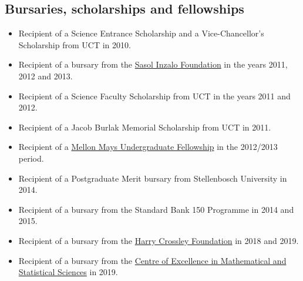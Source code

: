 \documentclass{article}
\begin{document}
\newpage
\subsection{Bursaries, scholarships and fellowships}
\begin{itemize}
	\item Recipient of a Science Entrance Scholarship and a Vice-Chancellor's Scholarship from UCT in 2010.
	\item Recipient of a bursary from the \href{http://www.sasolinzalofoundation.org.za/}{Sasol Inzalo Foundation} in the years 2011, 2012 and 2013.
	\item Recipient of a Science Faculty Scholarship from UCT in the years 2011 and 2012.
	\item Recipient of a Jacob Burlak Memorial Scholarship from UCT in 2011.
	\item Recipient of a \href{http://www.mmuf.org/}{Mellon Mays Undergraduate Fellowship} in the 2012/2013 period.
	\item Recipient of a Postgraduate Merit bursary from Stellenbosch University in 2014.
	\item Recipient of a bursary from the Standard Bank 150 Programme in 2014 and 2015.
	\item Recipient of a bursary from the \href{http://thecrossleyfoundation.co.za/}{Harry Crossley Foundation} in 2018 and 2019.
	\item Recipient of a bursary from the \href{https://www.wits.ac.za/coe-mass/}{Centre of Excellence in Mathematical and Statistical Sciences} in 2019.
\end{itemize}
\end{document}
